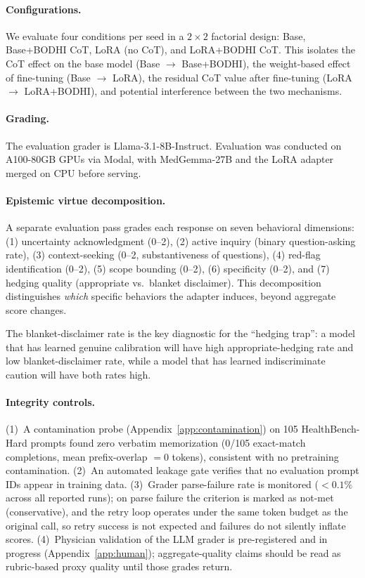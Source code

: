 \documentclass{article}
\newcommand{\bodhi}{BODHI}
\newcommand{\hbhard}{HealthBench-Hard}
\begin{document}
\paragraph{Configurations.} We evaluate four conditions per seed in a $2 \times 2$ factorial design: Base, Base+\bodhi{} CoT, LoRA (no CoT), and LoRA+\bodhi{} CoT. This isolates the CoT effect on the base model (Base $\to$ Base+\bodhi{}), the weight-based effect of fine-tuning (Base $\to$ LoRA), the residual CoT value after fine-tuning (LoRA $\to$ LoRA+\bodhi{}), and potential interference between the two mechanisms.

\paragraph{Grading.} The evaluation grader is Llama-3.1-8B-Instruct. Evaluation was conducted on A100-80GB GPUs via Modal, with MedGemma-27B and the LoRA adapter merged on CPU before serving.

\paragraph{Epistemic virtue decomposition.} A separate evaluation pass grades each response on seven behavioral dimensions: (1) uncertainty acknowledgment (0--2), (2) active inquiry (binary question-asking rate), (3) context-seeking (0--2, substantiveness of questions), (4) red-flag identification (0--2), (5) scope bounding (0--2), (6) specificity (0--2), and (7) hedging quality (appropriate vs.\ blanket disclaimer). This decomposition distinguishes \emph{which} specific behaviors the adapter induces, beyond aggregate score changes.

The blanket-disclaimer rate is the key diagnostic for the ``hedging trap'': a model that has learned genuine calibration will have high appropriate-hedging rate and low blanket-disclaimer rate, while a model that has learned indiscriminate caution will have both rates high.

\paragraph{Integrity controls.} (1)~A contamination probe (Appendix~\ref{app:contamination}) on 105 \hbhard{} prompts found zero verbatim memorization (0/105 exact-match completions, mean prefix-overlap $=0$ tokens), consistent with no pretraining contamination. (2)~An automated leakage gate verifies that no evaluation prompt IDs appear in training data. (3)~Grader parse-failure rate is monitored ($<0.1\%$ across all reported runs); on parse failure the criterion is marked as not-met (conservative), and the retry loop operates under the same token budget as the original call, so retry success is not expected and failures do not silently inflate scores. (4)~Physician validation of the LLM grader is pre-registered and in progress (Appendix~\ref{app:human}); aggregate-quality claims should be read as rubric-based proxy quality until those grades return.
\end{document}

